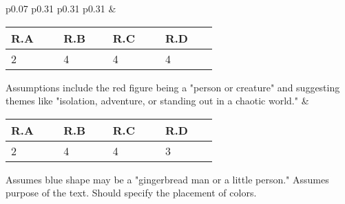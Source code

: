 {\begin{table*}[h]
{\begin{tabular}{p{0.07\linewidth} p{0.31\linewidth} p{0.31\linewidth} p{0.31\linewidth}}
        & 
        \begin{tabular}{| p{0.17\linewidth} | p{0.16\linewidth} | p{0.17\linewidth} | p{0.17\linewidth} |}
          \textbf{R.A} & \textbf{R.B} & \textbf{R.C} & \textbf{R.D} \\
          \hline
          2 & 4 & 4 & 4 \\
          \hline
        \end{tabular}
        \newline
        Assumptions include the red figure being a "person or creature" and suggesting themes like "isolation, adventure, or standing out in a chaotic world." 
        &
        \begin{tabular}{| p{0.17\linewidth} | p{0.16\linewidth} | p{0.17\linewidth} | p{0.17\linewidth} |}
          \textbf{R.A} & \textbf{R.B} & \textbf{R.C} & \textbf{R.D} \\
          \hline
          2 & 4 & 4 & 3 \\
          \hline
        \end{tabular}
        \newline
        Assumes blue shape may be a "gingerbread man or a little person." Assumes purpose of the text. Should specify the placement of colors. \hfill


\end{tabular}}
\end{table*}}
